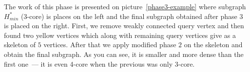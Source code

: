 The work of this phase is presented on picture~\ref{phase3-example} where subgraph $H_{min}^*$ (3-core) is places on the left and the final subgraph obtained after phase $3$ is placed on the right. First, we remove weakly connected query vertex and then found two yellow vertices which along with remaining query vertices give as a skeleton of $5$ vertices. After that we apply modified phase $2$ on the skeleton and obtain the final subgraph. As you can see, it is smaller and more dense than the first one~--- it is even 4-core when the previous was only 3-core.
